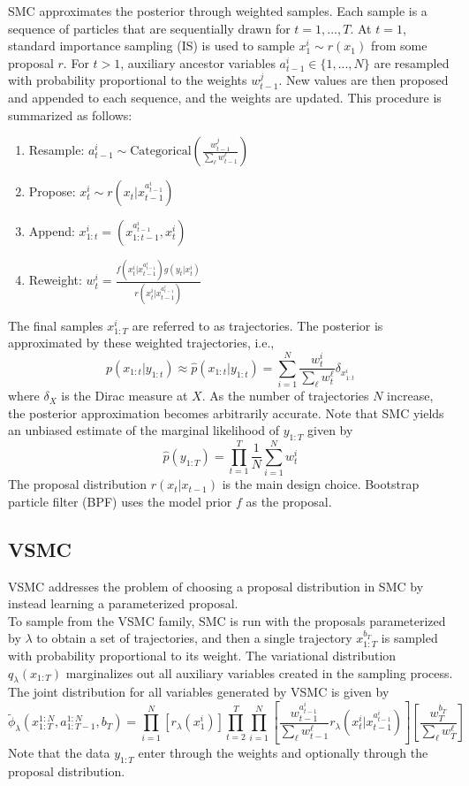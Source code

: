 \documentclass{article}
\begin{document}
SMC approximates the posterior through weighted samples. Each sample is a sequence of particles that are sequentially drawn for $t=1,...,T$. At $t=1$, standard importance sampling (IS) is used to sample $x_1^i\sim r(x_1)$ from some proposal $r$. For $t>1$, auxiliary ancestor variables $a_{t-1}^i\in\{1,...,N\}$ are resampled with probability proportional to the weights $w_{t-1}^j$. New values are then proposed and appended to each sequence, and the weights are updated. This procedure is summarized as follows:
\begin{enumerate}

\item
Resample: $a_{t-1}^i\sim\mathrm{Categorical}\left(\frac{w_{t-1}^j}{\sum_\ell w_{t-1}^\ell}\right)$

\item
Propose: $x_t^i\sim r(x_t|x_{t-1}^{a_{t-1}^i})$

\item
Append: $x_{1:t}^i = \left(x_{1:t-1}^{a_{t-1}^i},x_t^i\right)$

\item
Reweight: $w_t^i = \frac{f(x_t^i|x_{t-1}^{a_{t-1}^i})g(y_t|x_t^i)}{r(x_t^i|x_{t-1}^{a_{t-1}^i})}$

\end{enumerate}
The final samples $x_{1:T}^i$ are referred to as trajectories. The posterior is approximated by these weighted trajectories, i.e.,
\[
p(x_{1:t}|y_{1:t}) \approx \hat{p}(x_{1:t}|y_{1:t}) = \sum_{i=1}^N\frac{w_t^i}{\sum_\ell w_t^\ell}\delta_{x_{1:t}^i}
\]
where $\delta_X$ is the Dirac measure at $X$. As the number of trajectories $N$ increase, the posterior approximation becomes arbitrarily accurate. Note that SMC yields an unbiased estimate of the marginal likelihood of $y_{1:T}$ given by
\[
\hat{p}(y_{1:T}) = \prod_{t=1}^T\frac{1}{N}\sum_{i=1}^Nw_t^i
\]
The proposal distribution $r(x_t|x_{t-1})$ is the main design choice. Bootstrap particle filter (BPF) uses the model prior $f$ as the proposal.

\subsection{VSMC}

VSMC addresses the problem of choosing a proposal distribution in SMC by instead learning a parameterized proposal.
\\

To sample from the VSMC family, SMC is run with the proposals parameterized by $\lambda$ to obtain a set of trajectories, and then a single trajectory $x_{1:T}^{b_T}$ is sampled with probability proportional to its weight. The variational distribution $q_\lambda(x_{1:T})$ marginalizes out all auxiliary variables created in the sampling process. The joint distribution for all variables generated by VSMC is given by
\[
\tilde{\phi}_\lambda(x_{1:T}^{1:N},a_{1:T-1}^{1:N},b_T) = \prod_{i=1}^N\left[r_\lambda(x_1^i)\right]\prod_{t=2}^T\prod_{i=1}^N\left[\frac{w_{t-1}^{a_{t-1}^i}}{\sum_\ell w_{t-1}^\ell}r_\lambda(x_t^i|x_{t-1}^{a_{t-1}^i})\right]\left[\frac{w_T^{b_T}}{\sum_\ell w_T^\ell}\right]
\]
Note that the data $y_{1:T}$ enter through the weights and optionally through the proposal distribution.
\\
\end{document}
